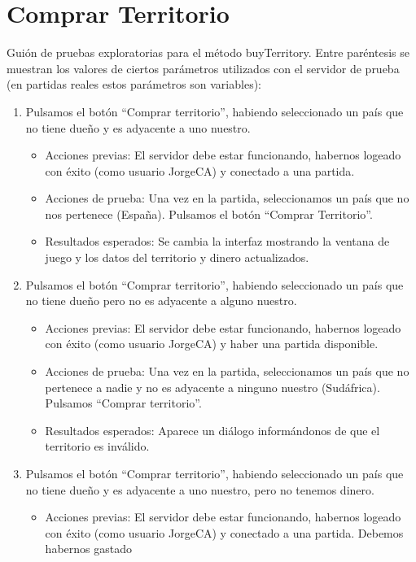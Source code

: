 \section{Comprar Territorio}

Guión de pruebas exploratorias para el método buyTerritory. Entre paréntesis se muestran los valores de ciertos parámetros utilizados con el servidor de prueba (en partidas
reales estos parámetros son variables):

\begin{enumerate}
\item Pulsamos el botón ``Comprar territorio'', habiendo seleccionado un país que no tiene dueño y es adyacente a uno nuestro.
	\begin{itemize}
	\item Acciones previas: El servidor debe estar funcionando, habernos logeado con éxito (como usuario JorgeCA)  y conectado a una partida.
	\item Acciones de prueba: Una vez en la  partida, seleccionamos un país que no nos pertenece (España). Pulsamos el botón ``Comprar Territorio''. 
	\item Resultados esperados: Se cambia la interfaz mostrando la ventana de juego y los datos del territorio y dinero actualizados.
	\end{itemize}
\item Pulsamos el botón ``Comprar territorio'', habiendo seleccionado un país que no tiene dueño pero no es adyacente a alguno nuestro.
	\begin{itemize}
	\item Acciones previas: El servidor debe estar funcionando, habernos logeado con éxito (como usuario JorgeCA) y haber una partida disponible.
	\item Acciones de prueba: Una vez en la  partida, seleccionamos un país que no pertenece a nadie y no es adyacente a ninguno nuestro 
	(Sudáfrica). Pulsamos ``Comprar territorio''.
	\item Resultados esperados: Aparece un diálogo informándonos de que el territorio es inválido.
	\end{itemize}
\item Pulsamos el botón ``Comprar territorio'', habiendo seleccionado un país que no tiene dueño y es adyacente a uno nuestro, pero no tenemos dinero.
	\begin{itemize}
	\item Acciones previas: El servidor debe estar funcionando, habernos logeado con éxito (como usuario JorgeCA) y conectado a una partida. Debemos habernos gastado

\end{itemize}
\end{enumerate}
